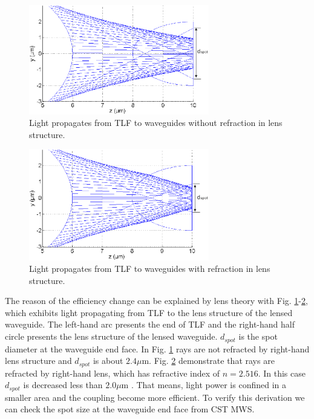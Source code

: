 \begin{figure}[!ht]
\centering
\includegraphics[width=0.7\textwidth]{bilder/beam_ray_without_refract}
\caption{Light propagates from TLF to waveguides without refraction in lens structure.}
\label{fig:matlab_coupling_lenses_rxx}
\end{figure}
\begin{figure}[!ht]
\centering
\includegraphics[width=0.7\textwidth]{bilder/beam_ray_refract}
\caption{ Light propagates from TLF to waveguides with refraction in lens structure.}
\label{fig:matlab_coupling_lenses_rxx2}
\end{figure} 
The reason of the efficiency change can be explained by lens theory with Fig. \ref{fig:matlab_coupling_lenses_rxx}-\ref{fig:matlab_coupling_lenses_rxx2}, which exhibits light propagating from TLF to the lens structure of the lensed waveguide. The left-hand arc presents the end of TLF and the right-hand half circle presents the lens structure of the lensed waveguide. $d_{spot}$ is the spot diameter at the waveguide end face. In Fig. \ref{fig:matlab_coupling_lenses_rxx} rays are not refracted by right-hand lens structure and $d_{spot}$ is about $2.4\mu$m. Fig. \ref{fig:matlab_coupling_lenses_rxx2} demonstrate that rays are refracted by right-hand lens, which has refractive index of $n=2.516$. In this case $d_{spot}$ is decreased less than $2.0\mu$m . That means, light power is confined in a smaller area and the coupling become more efficient. To verify this derivation we can check the spot size at the waveguide end face from CST MWS.\\

